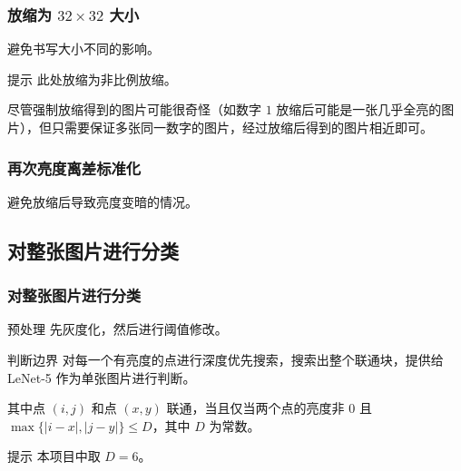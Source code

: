 \documentclass[10pt,aspectratio=43,serif]{beamer}
\begin{document}
\begin{frame}
    \frametitle{放缩为 $32 \times 32$ 大小}
    避免书写大小不同的影响。
    
    \begin{exampleblock}{提示}
        此处放缩为非比例放缩。
        
        尽管强制放缩得到的图片可能很奇怪（如数字 $1$ 放缩后可能是一张几乎全亮的图片），但只需要保证多张同一数字的图片，经过放缩后得到的图片相近即可。
    \end{exampleblock}
    
    \begin{figure}
        \qquad
    \end{figure}
\end{frame}

\begin{frame}
    \frametitle{再次亮度离差标准化}
    避免放缩后导致亮度变暗的情况。
    
    \begin{figure}
        \qquad
    \end{figure}
\end{frame}

\subsection{对整张图片进行分类}
\begin{frame}
    \frametitle{对整张图片进行分类}
    
    \begin{block}{预处理}
        先灰度化，然后进行阈值修改。
    \end{block}
    
    \begin{block}{判断边界}
        对每一个有亮度的点进行深度优先搜索，搜索出整个联通块，提供给 LeNet-5 作为单张图片进行判断。
        
        其中点 $(i, j)$ 和点 $(x, y)$ 联通，当且仅当两个点的亮度非 $0$ 且 $\max\{|i - x|, |j - y|\} \leq D$，其中 $D$ 为常数。
    \end{block}
    
    \begin{exampleblock}{提示}
        本项目中取 $D = 6$。
    \end{exampleblock}
\end{frame}
\end{document}
